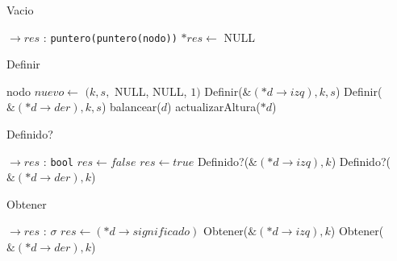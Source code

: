 \begin{Algoritmos}
\begin{algorithm}
\caption{Vacio}
\begin{algorithmic}[1]
$\to res$ : \texttt{puntero(puntero(nodo))}
	\State $*res \gets$ NULL
\EndProcedure
\end{algorithmic}
\end{algorithm}

\begin{algorithm}
\caption{Definir}
\begin{algorithmic}[1]
    \State nodo $nuevo \gets$ $(k, s,$ NULL, NULL, $1)$
  \Else
			\State Definir($\&(*d\to izq), k, s$)
		\Else
			\State Definir($\&(*d\to der), k, s$)
		\EndIf
  \EndIf
  \State balancear($d$)
  \State actualizarAltura($*d$)
\EndProcedure
\end{algorithmic}
\end{algorithm}

\begin{algorithm}
\caption{Definido?}
\begin{algorithmic}[1]
$\to res$ : \texttt{bool}
	 \State $res\gets false$
	 \Else	
			\State $res\gets true$
		\Else
				\State Definido?($\&(*d\to izq), k$)		
			\Else
				\State Definido?($\&(*d\to der), k$)
			\EndIf
		\EndIf
	\EndIf
\EndProcedure
\end{algorithmic}
\end{algorithm}

\begin{algorithm}
\caption{Obtener}
\begin{algorithmic}[1]
$\to res$ : \texttt{$\sigma$}	
		\State $res\gets (*d\to significado)$
	\Else
			\State Obtener($\&(*d\to izq), k$)		
		\Else
			\State Obtener($\&(*d\to der), k$)
		\EndIf
	\EndIf

\EndProcedure
\end{algorithmic}
\end{algorithm}


\end{Algoritmos}
